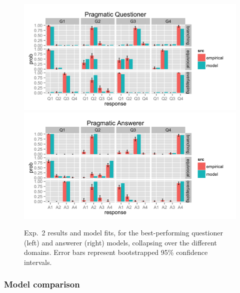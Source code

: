 \documentclass[12pt, floatsintext, jou]{apa6}
\begin{document}
\begin{figure}[t!]
\begin{center}
\includegraphics[scale = .25]{Exp4QuestResults}
\includegraphics[scale = .25]{Exp4AnsResults}
\end{center}
\caption{Exp.~2 results and model fits, for the best-performing questioner (left) and answerer (right) models, collapsing over the different domains. Error bars represent bootstrapped 95\% confidence intervals.}
\label{fig:exp4res}
\end{figure}

\subsubsection{Model comparison}
\end{document}
